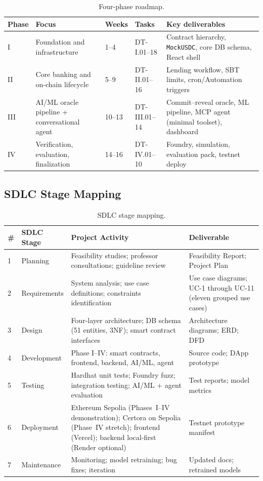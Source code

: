 \documentclass[12pt,a4paper]{report}
\newcommand{\tableheadcolor}{\rowcolor{TableHeadBg}}
\begin{document}
\begin{table}[H]
\centering
\caption[Four-phase roadmap]{Four-phase roadmap.}
\label{tab:phase-roadmap}
\begin{tabular}{p{1.5cm}p{3.5cm}p{2cm}p{2cm}p{3cm}}
\toprule
\tableheadcolor
\textbf{Phase} & \textbf{Focus} & \textbf{Weeks} & \textbf{Tasks} & \textbf{Key deliverables} \\
\midrule
I & Foundation and infrastructure & 1--4 & DT-I.01--18 & Contract hierarchy, \texttt{MockUSDC}, core DB schema, React shell \\
II & Core banking and on-chain lifecycle & 5--9 & DT-II.01--16 & Lending workflow, SBT limits, cron/Automation triggers \\
III & AI/ML oracle pipeline + conversational agent & 10--13 & DT-III.01--14 & Commit--reveal oracle, ML pipeline, MCP agent (minimal toolset), dashboard \\
IV & Verification, evaluation, finalization & 14--16 & DT-IV.01--10 & Foundry, simulation, evaluation pack, testnet deploy \\
\bottomrule
\end{tabular}
\end{table}

\subsection{SDLC Stage Mapping}

\begin{table}[H]
\centering
\caption[SDLC stage mapping]{SDLC stage mapping.}
\label{tab:sdlc-mapping}
\begin{tabular}{p{0.5cm}p{2.5cm}p{4.5cm}p{5cm}}
\toprule
\tableheadcolor
\textbf{\#} & \textbf{SDLC Stage} & \textbf{Project Activity} & \textbf{Deliverable} \\
\midrule
1 & Planning & Feasibility studies; professor consultations; guideline review & Feasibility Report; Project Plan \\
2 & Requirements & System analysis; use case definitions; constraints identification & Use case diagrams; UC-1 through UC-11 (eleven grouped use cases) \\
3 & Design & Four-layer architecture; DB schema (51 entities, 3NF); smart contract interfaces & Architecture diagrams; ERD; DFD \\
4 & Development & Phase I--IV: smart contracts, frontend, backend, AI/ML, agent & Source code; DApp prototype \\
5 & Testing & Hardhat unit tests; Foundry fuzz; integration testing; AI/ML + agent evaluation & Test reports; model metrics \\
6 & Deployment & Ethereum Sepolia (Phases~I--IV demonstration); Certora on Sepolia (Phase~IV stretch); frontend (Vercel); backend local-first (Render optional) & Testnet prototype manifest \\
7 & Maintenance & Monitoring; model retraining; bug fixes; iteration & Updated docs; retrained models \\
\bottomrule
\end{tabular}
\end{table}
\end{document}
